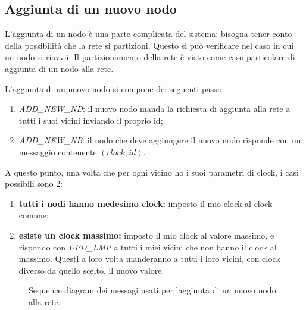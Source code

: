 \documentclass[italian]{memoir}
\begin{document}
\subsection{Aggiunta di un nuovo nodo}
L'aggiunta di un nodo è una parte complicata del sistema: bisogna tener conto della
	   possibilità che la rete si partizioni. Questo si può verificare nel caso in cui
	   un nodo si riavvii. Il partizionamento della rete è visto come caso particolare
	   di aggiunta di un nodo alla rete.

L'aggiunta di un nuovo nodo si compone dei seguenti passi:
\begin{enumerate}
	\item \textit{ADD\_NEW\_ND}: il nuovo nodo manda la richiesta di aggiunta alla rete
	   a tutti i suoi vicini inviando il proprio id;
	\item \textit{ADD\_NEW\_NB}: il nodo che deve aggiungere il nuovo nodo risponde
	   con un messaggio contenente $(clock,id)$.
\end{enumerate}
A questo punto, una volta che per ogni vicino ho i suoi parametri di clock, i casi
	   possibili sono 2:
\begin{enumerate}
	\item \textbf{tutti i nodi hanno medesimo clock:} imposto il mio clock al clock
	   comune;
	\item \textbf{esiste un clock massimo:} imposto il mio clock al valore massimo,
	   e rispondo con \textit{UPD\_LMP} a tutti i miei vicini che non hanno il clock al
	   massimo. Questi a loro volta manderanno a tutti i loro vicini, con clock diverso
	   da quello scelto, il nuovo valore.
\end{enumerate}

\begin{figure}[H]
\caption{Sequence diagram dei messagi usati per laggiunta di un nuovo nodo alla rete.}
\label{img:newnode}
\end{figure}
\end{document}
